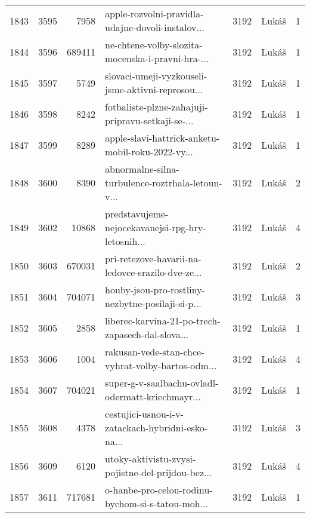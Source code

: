 \begin{tabular}{lrrlrlr}
1843 &       3595 &     7958 &  apple-rozvolni-pravidla-udajne-dovoli-instalov... &     3192 &                        Lukáš &               1 \\
1844 &       3596 &   689411 &  ne-chtene-volby-slozita-mocenska-i-pravni-hra-... &     3192 &                        Lukáš &               1 \\
1845 &       3597 &     5749 &  slovaci-umeji-vyzkouseli-jsme-aktivni-reprosou... &     3192 &                        Lukáš &               1 \\
1846 &       3598 &     8242 &  fotbaliste-plzne-zahajuji-pripravu-setkaji-se-... &     3192 &                        Lukáš &               1 \\
1847 &       3599 &     8289 &  apple-slavi-hattrick-anketu-mobil-roku-2022-vy... &     3192 &                        Lukáš &               1 \\
1848 &       3600 &     8390 &  abnormalne-silna-turbulence-roztrhala-letoun-v... &     3192 &                        Lukáš &               2 \\
1849 &       3602 &    10868 &  predstavujeme-nejocekavanejsi-rpg-hry-letosnih... &     3192 &                        Lukáš &               4 \\
1850 &       3603 &   670031 &  pri-retezove-havarii-na-ledovce-srazilo-dve-ze... &     3192 &                        Lukáš &               2 \\
1851 &       3604 &   704071 &  houby-jsou-pro-rostliny-nezbytne-posilaji-si-p... &     3192 &                        Lukáš &               3 \\
1852 &       3605 &     2858 &  liberec-karvina-21-po-trech-zapasech-dal-slova... &     3192 &                        Lukáš &               1 \\
1853 &       3606 &     1004 &  rakusan-vede-stan-chce-vyhrat-volby-bartos-odm... &     3192 &                        Lukáš &               4 \\
1854 &       3607 &   704021 &  super-g-v-saalbachu-ovladl-odermatt-kriechmayr... &     3192 &                        Lukáš &               1 \\
1855 &       3608 &     4378 &  cestujici-usnou-i-v-zatackach-hybridni-esko-na... &     3192 &                        Lukáš &               3 \\
1856 &       3609 &     6120 &  utoky-aktivistu-zvysi-pojistne-del-prijdou-bez... &     3192 &                        Lukáš &               4 \\
1857 &       3611 &   717681 &  o-hanbe-pro-celou-rodinu-bychom-si-s-tatou-moh... &     3192 &                        Lukáš &               1 \\

\end{tabular}
